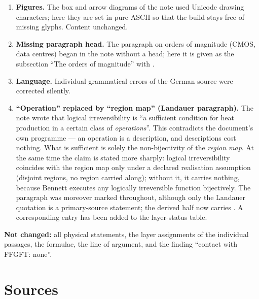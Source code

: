 \begin{enumerate}[leftmargin=1.6em,itemsep=0.4em]
        order here (hardware $\ne$ computational operation, then the hardware
        side, then continuous operation, then quantum computers) and carried as
        subsections of Section~\ref{sec:content}.
  \item \textbf{Figures.} The box and arrow diagrams of the note used Unicode
        drawing characters; here they are set in pure ASCII so that the build
        stays free of missing glyphs. Content unchanged.
  \item \textbf{Missing paragraph head.} The paragraph on orders of magnitude
        (CMOS, data centres) began in the note without a head; here it is given as
        the subsection “The orders of magnitude” with \LK.
  \item \textbf{Language.} Individual grammatical errors of the German source were
        corrected silently.
  \item \textbf{“Operation” replaced by “region map” (Landauer paragraph).} The
        note wrote that logical irreversibility is “a sufficient condition for
        heat production in a certain class of \emph{operations}”. This
        contradicts the document's own programme --- an operation is a
        description, and descriptions cost nothing. What is sufficient is solely
        the non-bijectivity of the \emph{region map}. At the same time the claim
        is stated more sharply: logical irreversibility coincides with the region
        map only under a declared realisation assumption (disjoint regions, no
        region carried along); without it, it carries nothing, because Bennett
        executes any logically irreversible function bijectively. The paragraph
        was moreover marked \LK throughout, although only the Landauer quotation
        is a primary-source statement; the derived half now carries \LB. A
        corresponding entry has been added to the layer-status table.
\end{enumerate}

\textbf{Not changed:} all physical statements, the layer assignments of the
individual passages, the formulae, the line of argument, and the finding “contact
with FFGFT: none”.

\clearpage
{}
{}
\section*{Sources}

